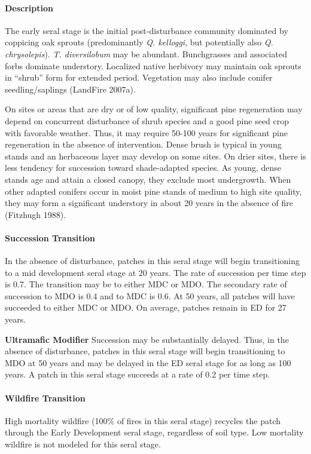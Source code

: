 \paragraph{Description}
The early seral stage is the initial post-disturbance community dominated by coppicing oak sprouts (predominantly \emph{Q. kelloggi}, but potentially also \emph{Q. chrysolepis}). \emph{T. diversilobum} may be abundant. Bunchgrasses and associated forbs dominate understory. Localized native herbivory may maintain oak sprouts in ``shrub'' form for extended period. Vegetation may also include conifer seedling/saplings (LandFire 2007a).

On sites or areas that are dry or of low quality, significant pine regeneration may depend on concurrent disturbance of shrub species and a good pine seed crop with favorable weather. Thus, it may require 50-100 years for significant pine regeneration in the absence of intervention. Dense brush is typical in young stands and an herbaceous layer may develop on some sites. On drier sites, there is less tendency for succession toward shade-adapted species. As young, dense stands age and attain a closed canopy, they exclude most undergrowth. When other adapted conifers occur in moist pine stands of medium to high site quality, they may form a significant understory in about 20 years in the absence of fire (Fitzhugh 1988).

\paragraph{Succession Transition} In the absence of disturbance, patches in this seral stage will begin transitioning to a mid development seral stage at 20 years. The rate of succession per time step is 0.7. The transition may be to either MDC or MDO. The secondary rate of succession to MDO is 0.4 and to MDC is 0.6. At 50 years, all patches will have succeeded to either MDC or MDO. On average, patches remain in ED for 27 years.
\begin{adjustwidth}{2cm}{}
\medskip
\textbf{Ultramafic Modifier} Succession may be substantially delayed. Thus, in the absence of disturbance, patches in this seral stage will begin transitioning to MDO at 50 years and may be delayed in the ED seral stage for as long as 100 years. A patch in this seral stage succeeds at a rate of 0.2 per time step. 

\end{adjustwidth}
\paragraph{Wildfire Transition}
High mortality wildfire (100\% of fires in this seral stage) recycles the patch through the Early Development seral stage, regardless of soil type. Low mortality wildfire is not modeled for this seral stage.


